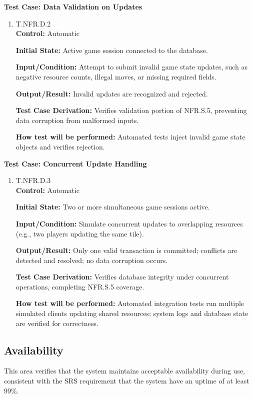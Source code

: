 \documentclass[12pt, titlepage]{article}
\begin{document}
\textbf{Test Case: Data Validation on Updates}

\begin{enumerate}
\item{\hypertarget{T.NFR.D.2}{T.NFR.D.2}\\}
\textbf{Control:} Automatic

\textbf{Initial State:} Active game session connected to the database.

\textbf{Input/Condition:} Attempt to submit invalid game state updates, such as negative resource counts, illegal moves, or missing required fields.

\textbf{Output/Result:} Invalid updates are recognized and rejected.

\textbf{Test Case Derivation:} Verifies validation portion of NFR.S.5, preventing data corruption from malformed inputs.

\textbf{How test will be performed:} Automated tests inject invalid game state objects and verifies rejection.
\end{enumerate}

\textbf{Test Case: Concurrent Update Handling}

\begin{enumerate}
\item{\hypertarget{T.NFR.D.3}{T.NFR.D.3}\\}
\textbf{Control:} Automatic

\textbf{Initial State:} Two or more simultaneous game sessions active.

\textbf{Input/Condition:} Simulate concurrent updates to overlapping resources (e.g., two players updating the same tile).

\textbf{Output/Result:} Only one valid transaction is committed; conflicts are detected and resolved; no data corruption occurs.

\textbf{Test Case Derivation:} Verifies database integrity under concurrent operations, completing NFR.S.5 coverage.

\textbf{How test will be performed:} Automated integration tests run multiple simulated clients updating shared resources; system logs and database state are verified for correctness.
\end{enumerate}
\subsection{Availability}

This area verifies that the system maintains acceptable availability during use,
consistent with the SRS requirement that the system have an uptime of at least 99\%.
\end{document}
